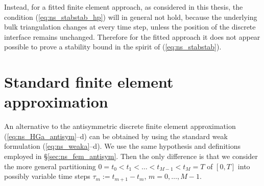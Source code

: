 Instead, for a fitted finite element approach, as considered in this thesis,
the condition (\ref{eq:ns_stabstab_hp}) will in general not hold, because the
underlying bulk triangulation changes at every time step, unless the position
of the discrete interface remains unchanged.
Therefore for the fitted approach it does not appear possible to prove a
stability bound in the spirit of (\ref{eq:ns_stabstab}).

\section{Standard finite element approximation}\label{sec:ns_fem}
An alternative to the antisymmetric discrete finite element approximation
(\ref{eq:ns_HGa_antisym}--d) can be obtained by using the standard weak
formulation (\ref{eq:ns_weaka}--d). We use the same hypothesis and
definitions employed in \S\ref{sec:ns_fem_antisym}. Then the only difference is
that we consider the more general partitioning  $0= t_0 < t_1 < \ldots <
t_{M-1} < t_M = T$ of $[0,T]$ into possibly variable time steps $\tau_m :=
t_{m+1}-t_m$, $m=0 ,\ldots, M-1$.

